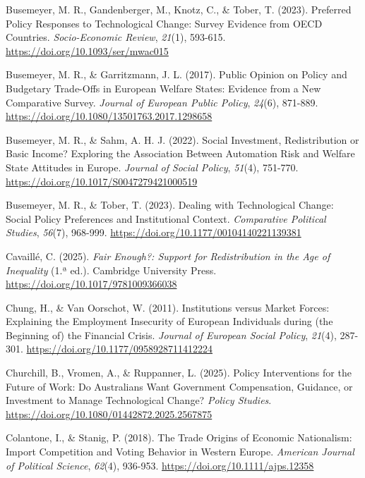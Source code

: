 \documentclass[
  spanish,
  12pt,
]{article}
\newlength{\cslhangindent}
\newenvironment{CSLReferences}[2] %
 {\begin{list}{}{%
  \setlength{\itemindent}{0pt}
  \setlength{\leftmargin}{0pt}
  \setlength{\parsep}{0pt}
  \ifodd #1
   \setlength{\leftmargin}{\cslhangindent}
   \setlength{\itemindent}{-1\cslhangindent}
  \fi
  \setlength{\itemsep}{#2\baselineskip}}}
 {\end{list}}
\begin{document}
\begin{CSLReferences}{1}{0}
Busemeyer, M. R., Gandenberger, M., Knotz, C., \& Tober, T. (2023).
Preferred Policy Responses to Technological Change: {Survey} Evidence
from {OECD} Countries. \emph{Socio-Economic Review}, \emph{21}(1),
593-615. \url{https://doi.org/10.1093/ser/mwac015}

Busemeyer, M. R., \& Garritzmann, J. L. (2017). Public Opinion on Policy
and Budgetary Trade-Offs in {European} Welfare States: {Evidence} from a
New Comparative Survey. \emph{Journal of European Public Policy},
\emph{24}(6), 871-889.
\url{https://doi.org/10.1080/13501763.2017.1298658}

Busemeyer, M. R., \& Sahm, A. H. J. (2022). Social {Investment},
{Redistribution} or {Basic Income}? {Exploring} the {Association Between
Automation Risk} and {Welfare State Attitudes} in {Europe}.
\emph{Journal of Social Policy}, \emph{51}(4), 751-770.
\url{https://doi.org/10.1017/S0047279421000519}

Busemeyer, M. R., \& Tober, T. (2023). Dealing with Technological
Change: {Social} Policy Preferences and Institutional Context.
\emph{Comparative Political Studies}, \emph{56}(7), 968-999.
\url{https://doi.org/10.1177/00104140221139381}

Cavaillé, C. (2025). \emph{Fair {Enough}?: {Support} for
{Redistribution} in the {Age} of {Inequality}} (1.ª ed.). Cambridge
University Press. \url{https://doi.org/10.1017/9781009366038}

Chung, H., \& Van Oorschot, W. (2011). Institutions versus Market
Forces: {Explaining} the Employment Insecurity of {European} Individuals
during (the Beginning of) the Financial Crisis. \emph{Journal of
European Social Policy}, \emph{21}(4), 287-301.
\url{https://doi.org/10.1177/0958928711412224}

Churchill, B., Vromen, A., \& Ruppanner, L. (2025). Policy Interventions
for the Future of Work: {Do Australians} Want Government Compensation,
Guidance, or Investment to Manage Technological Change? \emph{Policy
Studies}. \url{https://doi.org/10.1080/01442872.2025.2567875}

Colantone, I., \& Stanig, P. (2018). The Trade Origins of Economic
Nationalism: {Import} Competition and Voting Behavior in {Western
Europe}. \emph{American Journal of Political Science}, \emph{62}(4),
936-953. \url{https://doi.org/10.1111/ajps.12358}


\end{CSLReferences}
\end{document}
